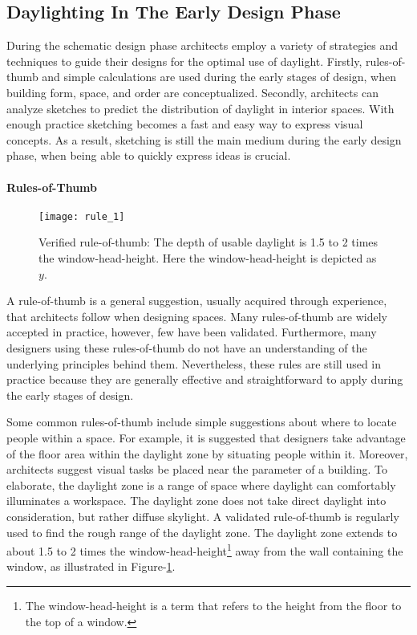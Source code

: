   \subsection{Daylighting In The Early Design Phase}
  During the schematic design phase architects employ a variety of strategies and techniques to guide their designs for the optimal use of daylight.
  Firstly, rules-of-thumb and simple calculations are used during the early stages of design, when building form, space, and order are conceptualized.
  Secondly, architects can analyze sketches to predict the distribution of daylight in interior spaces.
  With enough practice sketching becomes a fast and easy way to express visual concepts.
  As a result, sketching is still the main medium during the early design phase, when being able to quickly express ideas is crucial.

  \paragraph{Rules-of-Thumb}

  \begin{figure}[h]
  \centering
  \texttt{[image: rule\_1]}
  \caption{Verified rule-of-thumb: The depth of usable daylight is 1.5 to 2 times the window-head-height. Here the window-head-height is depicted as $y$.}
  \label{fig:daylightzone}
  \end{figure}

  A rule-of-thumb is a general suggestion, usually acquired through experience, that architects follow when designing spaces. 
  Many rules-of-thumb are widely accepted in practice, however, few have been validated\cite{reinhart2005simulation}.
  Furthermore, many designers using these rules-of-thumb do not have an understanding of the underlying principles behind them\cite{Galasiu}.
  Nevertheless, these rules are still used in practice because they are generally effective and straightforward to apply during the early stages of design.

  Some common rules-of-thumb include simple suggestions about where to locate people within a space.
  For example, it is suggested that designers take advantage of the floor area within the daylight zone by situating people within it\cite{Leslie}.
  Moreover, architects suggest visual tasks be placed near the parameter of a building\cite{Leslie}.
  To elaborate, the daylight zone is a range of space where daylight can comfortably illuminates a workspace. 
  The daylight zone does not take direct daylight into consideration, but rather diffuse skylight.
  A validated rule-of-thumb is regularly used to find the rough range of the daylight zone\cite{reinhart2005simulation}. 
  The daylight zone extends to about 1.5 to 2 times the window-head-height\footnote{The window-head-height is a term that refers to the height from the floor to the top of a window.} away from the wall containing the window, as illustrated in Figure-\ref{fig:daylightzone}.

